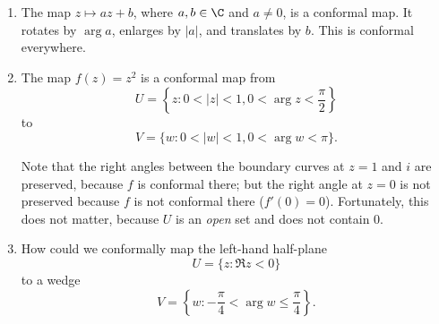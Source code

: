 \documentclass[a4paper]{article}
\begin{document}
\begin{eg}\leavevmode
  \begin{enumerate}
    \item The map $z \mapsto az + b$, where $a, b \in \C$ and $a\not= 0$, is a conformal map. It rotates by $\arg a$, enlarges by $|a|$, and translates by $b$. This is conformal everywhere.
    \item The map $f(z) = z^2$ is a conformal map from
      \[
        U = \left\{z: 0 < |z| < 1, 0 < \arg z < \frac{\pi}{2}\right\}
      \]
      to
      \[
        V = \{w: 0 < |w| < 1, 0 < \arg w < \pi\}.
      \]
      \begin{center}
      \end{center}
      Note that the right angles between the boundary curves at $z = 1$ and $i$ are preserved, because $f$ is conformal there; but the right angle at $z = 0$ is not preserved because $f$ is not conformal there ($f'(0) = 0$). Fortunately, this does not matter, because $U$ is an \emph{open} set and does not contain $0$.
    \item How could we conformally map the left-hand half-plane
      \[
        U = \{z: \Re z < 0\}
      \]
      to a wedge
      \[
        V = \left\{w: -\frac{\pi}{4} < \arg w\leq \frac{\pi}{4}\right\}.
      \]
      \begin{center}
\end{center}
\end{enumerate}
\end{eg}
\end{document}

